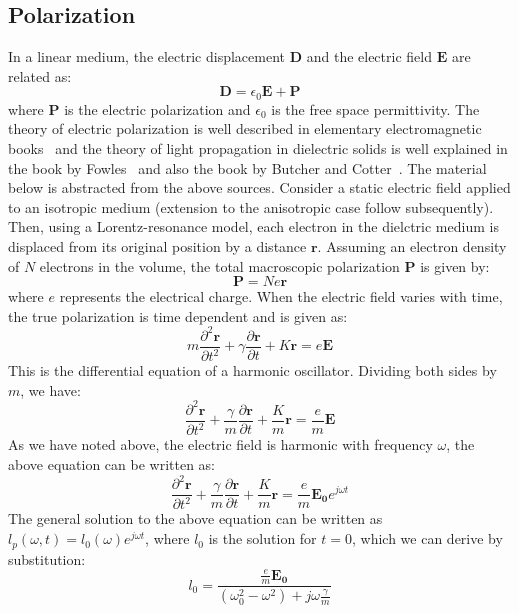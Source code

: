 \documentclass{article}[12pt]
\theoremstyle{plain}
\begin{document}
\subsection{Polarization }
\label{subsec:polarization}
In a linear medium, the electric displacement $\mathbf{D}$ and the electric field $\mathbf{E}$
are related as:
\begin{equation}
\mathbf{D} = \epsilon_0\mathbf{E} + \mathbf{P} \label{eqn:electric_displacement}
\end{equation}
where $\mathbf{P}$ is the electric polarization and $\epsilon_0$ is the free space permittivity.
The theory of electric polarization is well described in elementary electromagnetic books~\cite{balanis1999advanced}
and the theory of light propagation in dielectric solids is well explained in the book by Fowles~\cite{fowles1975introduction} and also the
book by Butcher and Cotter~\cite{butcher1991elements}. The material below is abstracted from the above sources. Consider a static electric field
applied to an isotropic medium (extension to the anisotropic case follow subsequently). Then, using a 
Lorentz-resonance model, each electron
in the dielctric medium is displaced from its original position by a distance $\mathbf{r}$. Assuming
an electron density of $N$ electrons in the volume, the total macroscopic polarization $\mathbf{P}$ is 
given by:
\begin{equation}
\mathbf{P} = N e \mathbf{r} \label{eqn:dipole_charge}
\end{equation}
where $e$ represents the electrical charge. When the electric field varies with time, the true
polarization is time dependent and is given as:
\[
m \frac{\partial^2 \mathbf{r}}{\partial t^2} + \gamma \frac{\partial \mathbf{r}}{\partial t} + K\mathbf{r} = e\mathbf{E}
\]
This is the differential equation of a harmonic oscillator. 
Dividing both sides by $m$, we have:
\[
\frac{\partial^2 \mathbf{r}}{\partial t^2} + \frac{\gamma}{m} \frac{\partial \mathbf{r}}{\partial t} + \frac{K}{m}\mathbf{r} = \frac{e}{m}\mathbf{E}
\]
As we have noted above, the electric field
is harmonic with frequency $\omega$, the above equation can be written as:
\[
\frac{\partial^2 \mathbf{r}}{\partial t^2} + \frac{\gamma}{m} \frac{\partial \mathbf{r}}{\partial t} + \frac{K}{m}\mathbf{r} = \frac{e}{m}\mathbf{E_0}e^{j\omega t}
\]
The general solution to the above equation can be written as $l_p(\omega,t) = l_0(\omega)e^{j\omega t}$, where
$l_0$ is the solution for $t=0$, which we can derive by substitution:
\[
l_0 = \frac{ \frac{e}{m} \mathbf{E_0}}{(\omega_0^2-\omega^2)+j\omega\frac{\gamma}{m}}
\]
\end{document}
